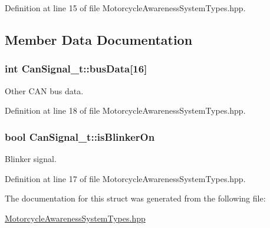 Definition at line 15 of file Motorcycle\-Awareness\-System\-Types.\-hpp.



\subsection{Member Data Documentation}
\hypertarget{structCanSignal__t_a460bece1b65aa03b07f986c71f818456}{
\subsubsection[{bus\-Data}]{\setlength{\rightskip}{0pt plus 5cm}int Can\-Signal\-\_\-t\-::bus\-Data\mbox{[}16\mbox{]}}}\label{structCanSignal__t_a460bece1b65aa03b07f986c71f818456}


Other C\-A\-N bus data. 



Definition at line 18 of file Motorcycle\-Awareness\-System\-Types.\-hpp.

\hypertarget{structCanSignal__t_a209edc6387534529f57c2362ec8f2586}{
\subsubsection[{is\-Blinker\-On}]{\setlength{\rightskip}{0pt plus 5cm}bool Can\-Signal\-\_\-t\-::is\-Blinker\-On}}\label{structCanSignal__t_a209edc6387534529f57c2362ec8f2586}


Blinker signal. 



Definition at line 17 of file Motorcycle\-Awareness\-System\-Types.\-hpp.



The documentation for this struct was generated from the following file\-:\begin{DoxyCompactItemize}
\item 
\hyperlink{MotorcycleAwarenessSystemTypes_8hpp}{Motorcycle\-Awareness\-System\-Types.\-hpp}\end{DoxyCompactItemize}

